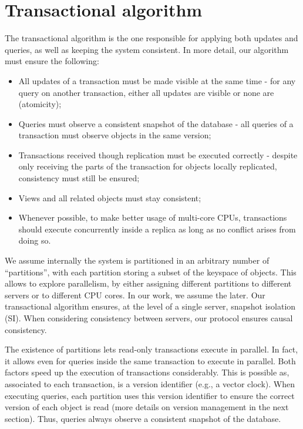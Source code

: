 \section{Transactional algorithm}
\label{sec:transactional_algorithm}

The transactional algorithm is the one responsible for applying both updates and queries, as well as keeping the system consistent.
In more detail, our algorithm must ensure the following:
\begin{itemize}
	\item All updates of a transaction must be made visible at the same time - for any query on another transaction, either all updates are visible or none are (atomicity);
	\item Queries must observe a consistent snapshot of the database - all queries of a transaction must observe objects in the same version;
	\item Transactions received though replication must be executed correctly - despite only receiving the parts of the transaction for objects locally replicated, consistency must still be ensured;
	\item Views and all related objects must stay consistent;
	\item Whenever possible, to make better usage of multi-core CPUs, transactions should execute concurrently inside a replica as long as no conflict arises from doing so.
\end{itemize}

We assume internally the system is partitioned in an arbitrary number of ``partitions'', with each partition storing a subset of the keyspace of objects.
This allows to explore parallelism, by either assigning different partitions to different servers or to different CPU cores.
In our work, we assume the later.
Our transactional algorithm ensures, at the level of a single server, snapshot isolation (SI).
When considering consistency between servers, our protocol ensures causal consistency.


The existence of partitions lets read-only transactions execute in parallel.
In fact, it allows even for queries inside the same transaction to execute in parallel.
Both factors speed up the execution of transactions considerably.
This is possible as, associated to each transaction, is a version identifier (e.g., a vector clock).
When executing queries, each partition uses this version identifier to ensure the correct version of each object is read (more details on version management in the next section).
Thus, queries always observe a consistent snapshot of the database.

